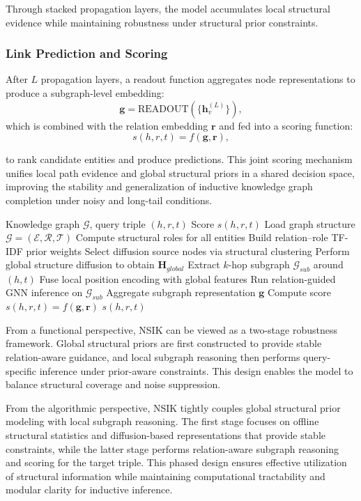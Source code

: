 \documentclass[preprint,12pt]{elsarticle}
\begin{document}
Through stacked propagation layers, the model accumulates local structural evidence while maintaining robustness under structural prior constraints.

\subsubsection{Link Prediction and Scoring}

After $L$ propagation layers, a readout function aggregates node representations to produce a subgraph-level embedding:
\[
\mathbf{g}=\text{READOUT}(\{\mathbf{h}_v^{(L)}\}),
\]
which is combined with the relation embedding $\mathbf{r}$ and fed into a scoring function:
\[
s(h,r,t)=f(\mathbf{g},\mathbf{r}),
\]

to rank candidate entities and produce predictions. This joint scoring mechanism unifies local path evidence and global structural priors in a shared decision space, improving the stability and generalization of inductive knowledge graph completion under noisy and long-tail conditions.

\begin{algorithm}[H]
\small
\caption{NSIK Overall Procedure}
\label{alg:nsik}
\begin{algorithmic}[1]
\Require Knowledge graph $\mathcal{G}$, query triple $(h,r,t)$
\Ensure Score $s(h,r,t)$
\State Load graph structure $\mathcal{G}=(\mathcal{E},\mathcal{R},\mathcal{T})$
\State Compute structural roles for all entities
\State Build relation–role TF-IDF prior weights
\State Select diffusion source nodes via structural clustering
\State Perform global structure diffusion to obtain $\mathbf{H}_{global}$
\State Extract $k$-hop subgraph $\mathcal{G}_{sub}$ around $(h,t)$
\State Fuse local position encoding with global features
\State Run relation-guided GNN inference on $\mathcal{G}_{sub}$
\State Aggregate subgraph representation $\mathbf{g}$
\State Compute score $s(h,r,t)=f(\mathbf{g},\mathbf{r})$
\State \Return $s(h,r,t)$
\end{algorithmic}
\end{algorithm}

From a functional perspective, NSIK can be viewed as a two-stage robustness framework. Global structural priors are first constructed to provide stable relation-aware guidance, and local subgraph reasoning then performs query-specific inference under prior-aware constraints. This design enables the model to balance structural coverage and noise suppression.

From the algorithmic perspective, NSIK tightly couples global structural prior modeling with local subgraph reasoning. The first stage focuses on offline structural statistics and diffusion-based representations that provide stable constraints, while the latter stage performs relation-aware subgraph reasoning and scoring for the target triple. This phased design ensures effective utilization of structural information while maintaining computational tractability and modular clarity for inductive inference.
\end{document}
